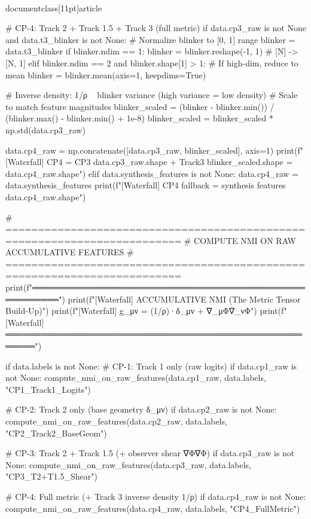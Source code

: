 \\documentclass[11pt]{article}
\begin{document}
\begin{CodeBlock}
    # CP-4: Track 2 + Track 1.5 + Track 3 (full metric)
    if data.cp3_raw is not None and data.t3_blinker is not None:
        # Normalize blinker to [0, 1] range
        blinker = data.t3_blinker
        if blinker.ndim == 1:
            blinker = blinker.reshape(-1, 1)  # [N] -> [N, 1]
        elif blinker.ndim == 2 and blinker.shape[1] > 1:
            # If high-dim, reduce to mean
            blinker = blinker.mean(axis=1, keepdims=True)

        # Inverse density: 1/ρ ~ blinker variance (high variance = low density)
        # Scale to match feature magnitudes
        blinker_scaled = (blinker - blinker.min()) / (blinker.max() - blinker.min() + 1e-8)
        blinker_scaled = blinker_scaled * np.std(data.cp3_raw)

        data.cp4_raw = np.concatenate([data.cp3_raw, blinker_scaled], axis=1)
        print(f"[Waterfall] CP4 = CP3 {data.cp3_raw.shape} + Track3 {blinker_scaled.shape} = {data.cp4_raw.shape}")
    elif data.synthesis_features is not None:
        data.cp4_raw = data.synthesis_features
        print(f"[Waterfall] CP4 fallback = synthesis features {data.cp4_raw.shape}")

    # =========================================================================
    # COMPUTE NMI ON RAW ACCUMULATIVE FEATURES
    # =========================================================================
    print(f"\n[Waterfall] ═══════════════════════════════════════════════════════")
    print(f"[Waterfall] ACCUMULATIVE NMI (The Metric Tensor Build-Up)")
    print(f"[Waterfall] g_μν = (1/ρ)·δ_μν + ∇_μΦ∇_νΦ")
    print(f"[Waterfall] ═══════════════════════════════════════════════════════")

    if data.labels is not None:
        # CP-1: Track 1 only (raw logits)
        if data.cp1_raw is not None:
            compute_nmi_on_raw_features(data.cp1_raw, data.labels, "CP1_Track1_Logits")

        # CP-2: Track 2 only (base geometry δ_μν)
        if data.cp2_raw is not None:
            compute_nmi_on_raw_features(data.cp2_raw, data.labels, "CP2_Track2_BaseGeom")

        # CP-3: Track 2 + Track 1.5 (+ observer shear ∇Φ∇Φ)
        if data.cp3_raw is not None:
            compute_nmi_on_raw_features(data.cp3_raw, data.labels, "CP3_T2+T1.5_Shear")

        # CP-4: Full metric (+ Track 3 inverse density 1/ρ)
        if data.cp4_raw is not None:
            compute_nmi_on_raw_features(data.cp4_raw, data.labels, "CP4_FullMetric")


\end{CodeBlock}
\end{document}
